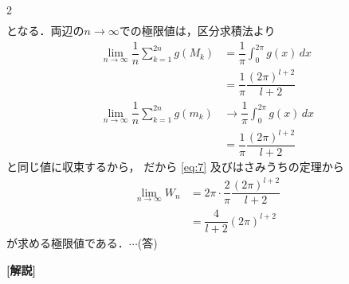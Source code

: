 \documentclass[../../main.tex]{subfiles}
\begin{document}
\begin{multicols}{2}
\begin{align}
  \end{align}
  となる．両辺の$n\to\infty$での極限値は，区分求積法より
  \begin{align}
    \lim_{n\to\infty}\dfrac{1}{n} \sum_{k=1}^{2n} g(M_k)
    & = \dfrac{1}{\pi} \int_0^{2\pi} g(x) \, dx   \\
    & = \dfrac{1}{\pi} \dfrac{(2\pi)^{l+2}}{l+2}   \\
    \lim_{n\to\infty}\dfrac{1}{n} \sum_{k=1}^{2n} g(m_k)
    & \to \dfrac{1}{\pi} \int_0^{2\pi} g(x) \, dx \\
    & = \dfrac{1}{\pi} \dfrac{(2\pi)^{l+2}}{l+2}
  \end{align}
  と同じ値に収束するから，
  だから \cref{eq:7} 及びはさみうちの定理から
  \begin{align}
    \lim_{n\to\infty} W_n
    & = 2\pi \cdot \dfrac{2}{\pi} \dfrac{(2\pi)^{l+2}}{l+2} \\
    & = \dfrac{4}{l+2} (2\pi)^{l+2}
  \end{align}
  が求める極限値である．$\cdots$(答)

  {\bf [解説]}

  \newpage
\end{multicols}
\end{document}
